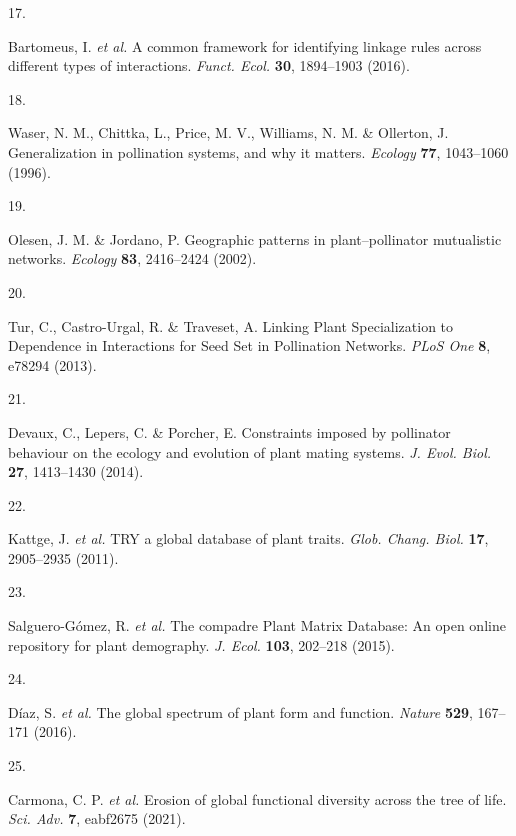 \documentclass[
  12pt,
  a4paper,
]{article}
\newlength{\cslhangindent}
\newlength{\csllabelwidth}
\newlength{\cslentryspacingunit} %
\newenvironment{CSLReferences}[2] %
 {%
  \setlength{\parindent}{0pt}
  \ifodd #1
  \let\oldpar\par
  \def\par{\hangindent=\cslhangindent\oldpar}
  \fi
  \setlength{\parskip}{#2\cslentryspacingunit}
 }%
 {}
\newcommand{\CSLLeftMargin}[1]{\parbox[t]{\csllabelwidth}{#1}}
\newcommand{\CSLRightInline}[1]{\parbox[t]{\linewidth - \csllabelwidth}{#1}\break}
\begin{document}
\begin{CSLReferences}{0}{0}
\leavevmode{}%
\CSLLeftMargin{17. }
\CSLRightInline{Bartomeus, I. \emph{et al.} A common framework for identifying linkage rules across different types of interactions. \emph{Funct. Ecol.} \textbf{30}, 1894--1903 (2016).}

\leavevmode{}%
\CSLLeftMargin{18. }
\CSLRightInline{Waser, N. M., Chittka, L., Price, M. V., Williams, N. M. \& Ollerton, J. Generalization in pollination systems, and why it matters. \emph{Ecology} \textbf{77}, 1043--1060 (1996).}

\leavevmode{}%
\CSLLeftMargin{19. }
\CSLRightInline{Olesen, J. M. \& Jordano, P. Geographic patterns in plant--pollinator mutualistic networks. \emph{Ecology} \textbf{83}, 2416--2424 (2002).}

\leavevmode{}%
\CSLLeftMargin{20. }
\CSLRightInline{Tur, C., Castro-Urgal, R. \& Traveset, A. Linking {Plant Specialization} to {Dependence} in {Interactions} for {Seed Set} in {Pollination Networks}. \emph{PLoS One} \textbf{8}, e78294 (2013).}

\leavevmode{}%
\CSLLeftMargin{21. }
\CSLRightInline{Devaux, C., Lepers, C. \& Porcher, E. Constraints imposed by pollinator behaviour on the ecology and evolution of plant mating systems. \emph{J. Evol. Biol.} \textbf{27}, 1413--1430 (2014).}

\leavevmode{}%
\CSLLeftMargin{22. }
\CSLRightInline{Kattge, J. \emph{et al.} {TRY} \textendash{} a global database of plant traits. \emph{Glob. Chang. Biol.} \textbf{17}, 2905--2935 (2011).}

\leavevmode{}%
\CSLLeftMargin{23. }
\CSLRightInline{Salguero-Gómez, R. \emph{et al.} The compadre {Plant Matrix Database}: An open online repository for plant demography. \emph{J. Ecol.} \textbf{103}, 202--218 (2015).}

\leavevmode{}%
\CSLLeftMargin{24. }
\CSLRightInline{Díaz, S. \emph{et al.} The global spectrum of plant form and function. \emph{Nature} \textbf{529}, 167--171 (2016).}

\leavevmode{}%
\CSLLeftMargin{25. }
\CSLRightInline{Carmona, C. P. \emph{et al.} Erosion of global functional diversity across the tree of life. \emph{Sci. Adv.} \textbf{7}, eabf2675 (2021).}


\end{CSLReferences}
\end{document}
